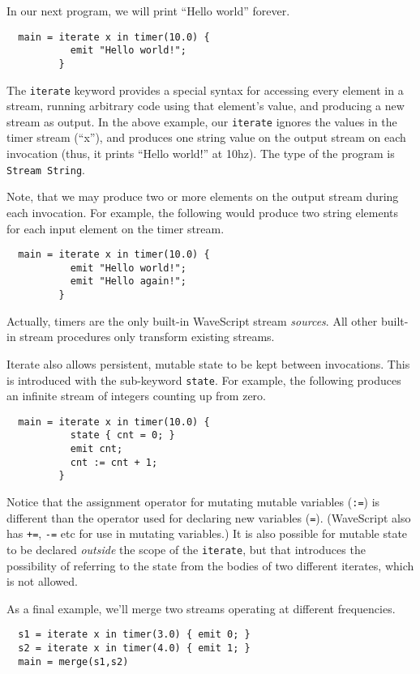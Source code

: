 \documentclass[twocolumn]{report}
\newcommand{\cde}{\tt}
\newcommand{\ws}{WaveScript}
\begin{document}
In our next program, we will print ``Hello world'' forever.
\begin{verbatim}
  main = iterate x in timer(10.0) {
           emit "Hello world!";
         }
\end{verbatim}
The {\cde iterate} keyword provides a special syntax for accessing
every element in a stream, running arbitrary code using that element's
value, and producing a new stream as output.  In the above example,
our {\cde iterate} ignores the values in the timer stream (``x''), and
produces one string value on the output stream on each invocation
(thus, it prints ``Hello world!'' at 10hz).  The type of the program
is {\tt Stream String}. 

Note, that we may produce two or more elements on the output stream
during each invocation.  For example, the following would produce two
string elements for each input element on the timer stream.
\begin{verbatim}
  main = iterate x in timer(10.0) {
           emit "Hello world!";
           emit "Hello again!";
         }
\end{verbatim}

Actually, timers are the only built-in {\ws} stream {\em sources}.
All other built-in stream procedures only transform existing streams.

Iterate also allows persistent, mutable state to be kept between
invocations.  This is introduced with the sub-keyword {\cde state}.
For example, the following produces an infinite stream of integers
counting up from zero.

\begin{verbatim}
  main = iterate x in timer(10.0) {
           state { cnt = 0; }
           emit cnt;
           cnt := cnt + 1;
         }
\end{verbatim}

Notice that the assignment operator for mutating mutable variables
({\cde :=}) is different than the operator used for declaring new
variables ({\cde =}).  ({\ws} also has {\cde +=}, {\cde -=} etc for use
in mutating variables.)  It is also possible for mutable state to be
declared {\em outside} the scope of the {\cde iterate}, but that introduces
the possibility of referring to the state from the bodies of two
different {\cd iterates}, which is not allowed.

As a final example, we'll merge two streams operating at different
frequencies.

\begin{verbatim}
  s1 = iterate x in timer(3.0) { emit 0; }
  s2 = iterate x in timer(4.0) { emit 1; }
  main = merge(s1,s2)
\end{verbatim}
\end{document}

